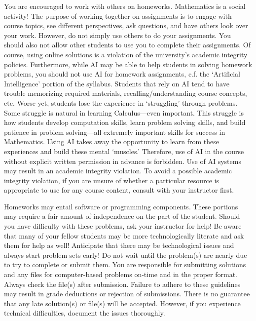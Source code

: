 \documentclass[11pt,letterpaper]{article}
\begin{document}
You are encouraged to work with others on homeworks. Mathematics is a social activity! The purpose of working together on assignments is to engage with course topics, see different perspectives, ask questions, and have others look over your work. However, do not simply use others to do your assignments. You should also not allow other students to use you to complete their assignments. Of course, using online solutions is a violation of the university's academic integrity policies. Furthermore, while AI may be able to help students in solving homework problems, you should not use AI for homework assignments, c.f. the `Artificial Intelligence' portion of the syllabus. Students that rely on AI tend to have trouble memorizing required materials, recalling/understanding course concepts, etc. Worse yet, students lose the experience in `struggling' through problems. Some struggle is natural in learning Calculus---even important. This struggle is how students develop computation skills, learn problem solving skills, and build patience in problem solving---all extremely important skills for success in Mathematics. Using AI takes away the opportunity to learn from these experiences and build these mental `muscles.' Therefore, use of AI in the course without explicit written permission in advance is forbidden. Use of AI systems may result in an academic integrity violation. To avoid a possible academic integrity violation, if you are unsure of whether a particular resource is appropriate to use for any course content, consult with your instructor first. \par\vspace{0.3cm}

Homeworks may entail software or programming components. These portions may require a fair amount of independence on the part of the student. Should you have difficulty with these problems, ask your instructor for help! Be aware that many of your fellow students may be more technologically literate and ask them for help as well! Anticipate that there may be technological issues and always start problem sets early! Do not wait until the problem(s) are nearly due to try to complete or submit them. You are responsible for submitting solutions and any files for computer-based problems on-time and in the proper format. Always check the file(s) after submission. Failure to adhere to these guidelines may result in grade deductions or rejection of submissions. There is no guarantee that any late solution(s) or file(s) will be accepted. However, if you experience technical difficulties, document the issues thoroughly. 
\sectionbreak
\end{document}
